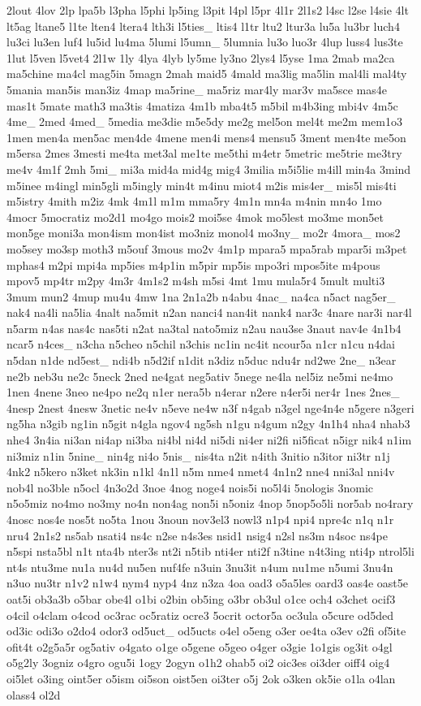 \begin{DoxyCompactItemize}
2lout 4lov 2lp lpa5b l3pha l5phi lp5ing l3pit l4pl l5pr 4l1r 2l1s2 l4sc l2se l4sie 4lt lt5ag ltane5 l1te lten4 ltera4 lth3i l5ties\-\_\- ltis4 l1tr ltu2 ltur3a lu5a lu3br luch4 lu3ci lu3en luf4 lu5id lu4ma 5lumi l5umn\-\_\- 5lumnia lu3o luo3r 4lup luss4 lus3te 1lut l5ven l5vet4 2l1w 1ly 4lya 4lyb ly5me ly3no 2lys4 l5yse 1ma 2mab ma2ca ma5chine ma4cl mag5in 5magn 2mah maid5 4mald ma3lig ma5lin mal4li mal4ty 5mania man5is man3iz 4map ma5rine\-\_\- ma5riz mar4ly mar3v ma5sce mas4e mas1t 5mate math3 ma3tis 4matiza 4m1b mba4t5 m5bil m4b3ing mbi4v 4m5c 4me\-\_\- 2med 4med\-\_\- 5media me3die m5e5dy me2g mel5on mel4t me2m mem1o3 1men men4a men5ac men4de 4mene men4i mens4 mensu5 3ment men4te me5on m5ersa 2mes 3mesti me4ta met3al me1te me5thi m4etr 5metric me5trie me3try me4v 4m1f 2mh 5mi\-\_\- mi3a mid4a mid4g mig4 3milia m5i5lie m4ill min4a 3mind m5inee m4ingl min5gli m5ingly min4t m4inu miot4 m2is mis4er\-\_\- mis5l mis4ti m5istry 4mith m2iz 4mk 4m1l m1m mma5ry 4m1n mn4a m4nin mn4o 1mo 4mocr 5mocratiz mo2d1 mo4go mois2 moi5se 4mok mo5lest mo3me mon5et mon5ge moni3a mon4ism mon4ist mo3niz monol4 mo3ny\-\_\- mo2r 4mora\-\_\- mos2 mo5sey mo3sp moth3 m5ouf 3mous mo2v 4m1p mpara5 mpa5rab mpar5i m3pet mphas4 m2pi mpi4a mp5ies m4p1in m5pir mp5is mpo3ri mpos5ite m4pous mpov5 mp4tr m2py 4m3r 4m1s2 m4sh m5si 4mt 1mu mula5r4 5mult multi3 3mum mun2 4mup mu4u 4mw 1na 2n1a2b n4abu 4nac\-\_\- na4ca n5act nag5er\-\_\- nak4 na4li na5lia 4nalt na5mit n2an nanci4 nan4it nank4 nar3c 4nare nar3i nar4l n5arm n4as nas4c nas5ti n2at na3tal nato5miz n2au nau3se 3naut nav4e 4n1b4 ncar5 n4ces\-\_\- n3cha n5cheo n5chil n3chis nc1in nc4it ncour5a n1cr n1cu n4dai n5dan n1de nd5est\-\_\- ndi4b n5d2if n1dit n3diz n5duc ndu4r nd2we 2ne\-\_\- n3ear ne2b neb3u ne2c 5neck 2ned ne4gat neg5ativ 5nege ne4la nel5iz ne5mi ne4mo 1nen 4nene 3neo ne4po ne2q n1er nera5b n4erar n2ere n4er5i ner4r 1nes 2nes\-\_\- 4nesp 2nest 4nesw 3netic ne4v n5eve ne4w n3f n4gab n3gel nge4n4e n5gere n3geri ng5ha n3gib ng1in n5git n4gla ngov4 ng5sh n1gu n4gum n2gy 4n1h4 nha4 nhab3 nhe4 3n4ia ni3an ni4ap ni3ba ni4bl ni4d ni5di ni4er ni2fi ni5ficat n5igr nik4 n1im ni3miz n1in 5nine\-\_\- nin4g ni4o 5nis\-\_\- nis4ta n2it n4ith 3nitio n3itor ni3tr n1j 4nk2 n5kero n3ket nk3in n1kl 4n1l n5m nme4 nmet4 4n1n2 nne4 nni3al nni4v nob4l no3ble n5ocl 4n3o2d 3noe 4nog noge4 nois5i no5l4i 5nologis 3nomic n5o5miz no4mo no3my no4n non4ag non5i n5oniz 4nop 5nop5o5li nor5ab no4rary 4nosc nos4e nos5t no5ta 1nou 3noun nov3el3 nowl3 n1p4 npi4 npre4c n1q n1r nru4 2n1s2 ns5ab nsati4 ns4c n2se n4s3es nsid1 nsig4 n2sl ns3m n4soc ns4pe n5spi nsta5bl n1t nta4b nter3s nt2i n5tib nti4er nti2f n3tine n4t3ing nti4p ntrol5li nt4s ntu3me nu1a nu4d nu5en nuf4fe n3uin 3nu3it n4um nu1me n5umi 3nu4n n3uo nu3tr n1v2 n1w4 nym4 nyp4 4nz n3za 4oa oad3 o5a5les oard3 oas4e oast5e oat5i ob3a3b o5bar obe4l o1bi o2bin ob5ing o3br ob3ul o1ce och4 o3chet ocif3 o4cil o4clam o4cod oc3rac oc5ratiz ocre3 5ocrit octor5a oc3ula o5cure od5ded od3ic odi3o o2do4 odor3 od5uct\-\_\- od5ucts o4el o5eng o3er oe4ta o3ev o2fi of5ite ofit4t o2g5a5r og5ativ o4gato o1ge o5gene o5geo o4ger o3gie 1o1gis og3it o4gl o5g2ly 3ogniz o4gro ogu5i 1ogy 2ogyn o1h2 ohab5 oi2 oic3es oi3der oiff4 oig4 oi5let o3ing oint5er o5ism oi5son oist5en oi3ter o5j 2ok o3ken ok5ie o1la o4lan olass4 ol2d 
\end{DoxyCompactItemize}
